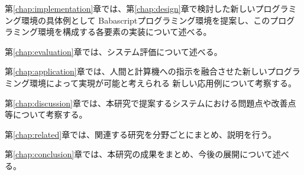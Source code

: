 第\ref{chap:implementation}章では、第\ref{chap:design}章で検討した新しいプログラミング環境の具体例として
Babascriptプログラミング環境を提案し、このプログラミング環境を構成する各要素の実装について述べる。

第\ref{chap:evaluation}章では、システム評価について述べる。

第\ref{chap:application}章では、人間と計算機への指示を融合させた新しいプログラミング環境によって実現が可能と考えられる
新しい応用例について考察する。

第\ref{chap:discussion}章では、本研究で提案するシステムにおける問題点や改善点等について考察する。

第\ref{chap:related}章では、関連する研究を分野ごとにまとめ、説明を行う。

第\ref{chap:conclusion}章では、本研究の成果をまとめ、今後の展開について述べる。
